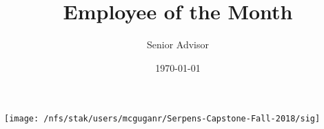 \documentclass[12pt]{article}
\title{Employee of the Month}
\author{Senior Advisor}
\date{\today}
\begin{document}
\maketitle
\texttt{[image: /nfs/stak/users/mcguganr/Serpens-Capstone-Fall-2018/sig]}
\end{document}
